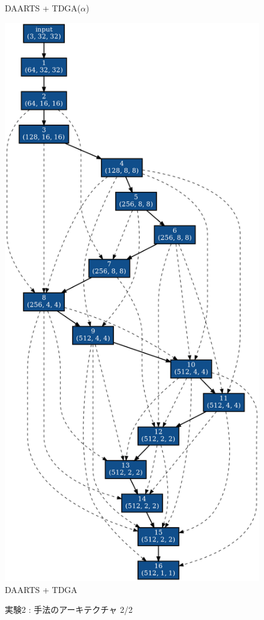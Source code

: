 \begin{figure}[tb]
\begin{minipage}{0.49\hsize}
\begin{center}
    DAARTS + TDGA($\alpha$)
 	\end{center}
 \end{minipage}
 \begin{minipage}{0.49\hsize}
 	\begin{center}
    \includegraphics[clip,scale=0.19]{./fig/04.exp/noevo_last.png}\\
    DAARTS + TDGA
 	\end{center}
 \end{minipage}
 \caption{実験2 : 手法のアーキテクチャ 2/2}
 \label{fig:exp2/archi2}
\end{figure}

